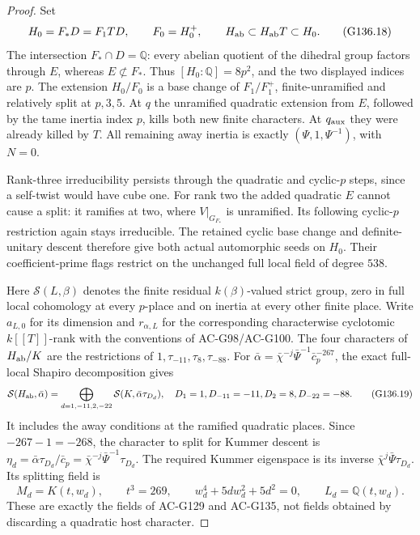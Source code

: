 \begin{proof}
Set
\[
 H_0=F_*D=F_1TD,\qquad F_0=H_0^+,\qquad
 H_{\rm ab}\subset H_{\rm ab}T\subset H_0.
 \tag{G136.18}
\]
The intersection \(F_*\cap D=\mathbb Q\): every abelian
quotient of the dihedral group factors through \(E\), whereas
\(E\not\subset F_*\).  Thus \([H_0:\mathbb Q]=8p^2\),
and the two displayed indices are \(p\).
The extension \(H_0/F_0\) is a base change of
\(F_1/F_1^+\), finite-unramified and relatively split at
\(p,3,5\).  At \(q\) the unramified quadratic extension from
\(E\), followed by the tame inertia index \(p\), kills both
new finite characters.  At \(q_{\rm aux}\) they were already
killed by \(T\).  All remaining away inertia is exactly
\((\Psi,1,\Psi^{-1})\), with \(N=0\).

Rank-three irreducibility persists through the quadratic and
cyclic-\(p\) steps, since a self-twist would have cube one.
For rank two the added quadratic \(E\) cannot cause a split:
it ramifies at two, where \(V|_{G_{F_*}}\) is unramified.
Its following cyclic-\(p\) restriction again stays irreducible.
The retained cyclic base change and definite-unitary descent
therefore give both actual automorphic seeds on \(H_0\).
Their coefficient-prime flags restrict on the unchanged full
local field of degree \(538\).

Here \(\mathcal S(L,\beta)\) denotes the finite residual
\(k(\beta)\)-valued strict group, zero in full local
cohomology at every \(p\)-place and on inertia at every
other finite place.  Write \(a_{L,0}\) for its dimension
and \(r_{\alpha,L}\) for the corresponding characterwise
cyclotomic \(k[[T]]\)-rank with the conventions of
AC-G98/AC-G100.
The four characters of \(H_{\rm ab}/K\) are the restrictions
of \(1,\tau_{-11},\tau_8,\tau_{-88}\).
For \(\bar\alpha=\bar\chi^{-j}\bar\Psi^{-1}\bar c_p^{-267}\),
the exact full-local Shapiro decomposition gives
\[
 \mathcal S(H_{\rm ab},\bar\alpha)
   =\bigoplus_{d=1,-11,2,-22}
                    \mathcal S(K,\bar\alpha\tau_{D_d}),
 \quad D_1=1, D_{-11}=-11, D_2=8, D_{-22}=-88.
 \tag{G136.19}
\]
It includes the away conditions at the ramified quadratic
places.  Since \(-267-1=-268\), the character to split for
Kummer descent is
\(\eta_d=\bar\alpha\tau_{D_d}/\bar c_p
=\bar\chi^{-j}\bar\Psi^{-1}\tau_{D_d}\).
The required Kummer eigenspace is its inverse
\(\bar\chi^j\bar\Psi\tau_{D_d}\).
Its splitting field is
\[
 M_d=K(t,w_d),\qquad t^3=269,\qquad
 w_d^4+5dw_d^2+5d^2=0,\qquad L_d=\mathbb Q(t,w_d).
 \tag{G136.20}
\]
These are exactly the fields of AC-G129 and AC-G135, not
fields obtained by discarding a quadratic host character.


\end{proof}
